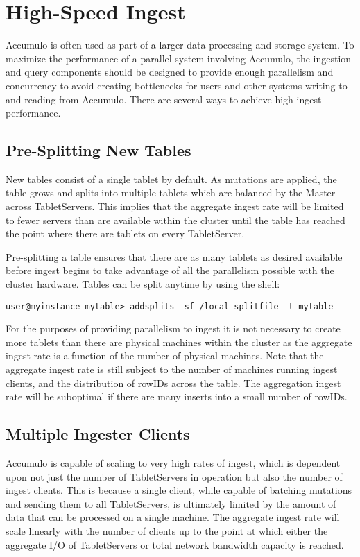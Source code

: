 \chapter{High-Speed Ingest}

Accumulo is often used as part of a larger data processing and storage system. To
maximize the performance of a parallel system involving Accumulo, the ingestion
and query components should be designed to provide enough parallelism and
concurrency to avoid creating bottlenecks for users and other systems writing to
and reading from Accumulo. There are several ways to achieve high ingest
performance.

\section{Pre-Splitting New Tables}

New tables consist of a single tablet by default. As mutations are applied, the table
grows and splits into multiple tablets which are balanced by the Master across
TabletServers. This implies that the aggregate ingest rate will be limited to fewer
servers than are available within the cluster until the table has reached the point
where there are tablets on every TabletServer.

Pre-splitting a table ensures that there are as many tablets as desired available
before ingest begins to take advantage of all the parallelism possible with the cluster
hardware. Tables can be split anytime by using the shell:

\small
\begin{verbatim}
user@myinstance mytable> addsplits -sf /local_splitfile -t mytable
\end{verbatim}
\normalsize

For the purposes of providing parallelism to ingest it is not necessary to create more
tablets than there are physical machines within the cluster as the aggregate ingest
rate is a function of the number of physical machines. Note that the aggregate ingest
rate is still subject to the number of machines running ingest clients, and the
distribution of rowIDs across the table. The aggregation ingest rate will be
suboptimal if there are many inserts into a small number of rowIDs.

\section{Multiple Ingester Clients}

Accumulo is capable of scaling to very high rates of ingest, which is dependent upon
not just the number of TabletServers in operation but also the number of ingest
clients. This is because a single client, while capable of batching mutations and
sending them to all TabletServers, is ultimately limited by the amount of data that
can be processed on a single machine. The aggregate ingest rate will scale linearly
with the number of clients up to the point at which either the aggregate I/O of
TabletServers or total network bandwidth capacity is reached.

